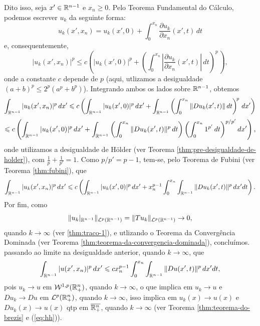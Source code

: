 \begin{prf}
    Dito isso, seja $x' \in \mathbb{R}^{n-1}$ e $x_n \geqslant 0$.
    Pelo Teorema Fundamental do Cálculo, podemos escrever $u_k$ da seguinte forma:
    \[
        u_k(x'\!,x_n) = u_k(x'\!,0) + \int_0^{x_n} \dfrac{\partial u_k}{\partial x_n} (x'\!,t) \,dt
    \]
    e, consequentemente,
    \[
        |u_k(x'\!,x_n)|^p \leqslant c \left(  |u_k(x'\!,0)|^p + \left(  \int_0^{x_n} \left|\dfrac{\partial u_k}{\partial x_n} (x'\!,t)\right| \,dt\right)^{\!p\,} \right),
    \]
    onde a constante $c$ depende de $p$ (aqui, utlizamos a desigualdade $(a + b)^p \leqslant 2^p (a^p + b^p)$). Integrando ambos os lados sobre $\mathbb{R}^{n-1}$, obtemos
    \[
        \int_{\mathbb{R}^{n-1}} |u_k(x',x_n)|^p \,dx' \leqslant c \left( \int_{\mathbb{R}^{n-1}} |u_k(x',0)|^p \,dx' + \int_{\mathbb{R}^{n-1}} \left(  \int_0^{x_n} \Vert Du_k(x',t) \Vert \,dt\right)^{\!p\,} dx' \right)
    \]
    \[
        \leqslant  c \left( \int_{\mathbb{R}^{n-1}} |u_k(x',0)|^p \,dx' + \int_{\mathbb{R}^{n-1}} \left( \int_0^{x_n} \Vert Du_k (x',t) \Vert^p \,dt \right)\left( \int_0^{x_n} 1^{p'} \,dt \right)^{p/p'} dx'\right),
    \]
    onde utilizamos a desigualdade de Hölder (ver Teorema \ref{thm:pre-desigualdade-de-holder}), com $\frac{1}{p}+ \frac{1}{p'} = 1$.
    Como $p/p' = p-1$, tem-se, pelo Teorema de Fubini (ver Teorema \ref{thm:fubini}), que
    \[
        \int_{\mathbb{R}^{n-1}} |u_k(x',x_n)|^p \,dx' \leqslant c \left( \int_{\mathbb{R}^{n-1}} |u_k(x',0)|^p \,dx' + x_n^{p-1} \int_{0}^{x_n} \int_{\mathbb{R}^{n-1}} \Vert Du_k (x',t) \Vert^p  \,dx'dt \right).
    \]
    Por fim, como
    \[
        \Vert u_k |_{\mathbb{R}^{n-1}} \Vert_{\mathcal{L}^p(\mathbb{R}^{n-1})} = \Vert Tu_k \Vert_{\mathcal{L}^p(\mathbb{R}^{n-1})} \to 0,
    \]
    quando $k \to \infty$ (ver \ref{thm:traco-1}), e utlizando o Teorema da Convergência Dominada (ver Teorema \ref{thm:teorema-da-convergencia-dominada}), concluímos. passando ao limite na desigualdade anterior, quando $k \to \infty$, que
    \begin{equation} \label{eq:uuuuu}
        \int_{\mathbb{R}^{n-1}} |u(x',x_n)|^p \,dx' \leqslant  c x_n^{p-1}\int_0^{x_n} \int_{\mathbb{R}^{n-1}} \Vert Du(x',t) \Vert^p \,dx'dt,
    \end{equation}
    pois $u_k \to u$ em $\mathcal{W}^{1,p}(\mathbb{R}^n_+)$, quando $k \to \infty$, o que implica em $u_k \to u$ e $Du_k \to Du$ em $\mathcal{L}^p(\mathbb{R}^n_+)$, quando $k \to \infty$, isso implica em $u_k(x) \to u(x)$ e $Du_k(x) \to u(x)$ qtp em $\overline{\mathbb{R}^n_+}$, quando $k \to \infty$ (ver Teorema \ref{thm:teorema-do-brezis} e (\ref{eq:hh})).
    
    \begin{figure}
        \centering
\end{figure}
\end{prf}
